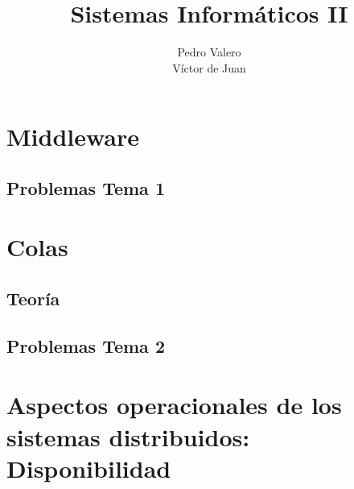 \documentclass{apuntes}
\author{Pedro Valero \\ Víctor de Juan}
\title{Sistemas Informáticos II}
\begin{document}
\maketitle
\newpage
\tableofcontents


\chapter{Middleware}



\section{Problemas Tema 1}
\newpage


\chapter{Colas}
\section{Teoría}
\section{Problemas Tema 2}



\chapter{Aspectos operacionales de los sistemas distribuidos: Disponibilidad}


\printindex
\end{document}
